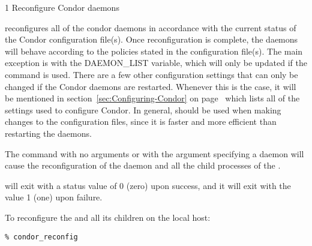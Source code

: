\begin{ManPage}{\label{man-condor-reconfig}}{1}
{Reconfigure Condor daemons}
\Synopsis {}
\ToolArgsBase

\ToolArgsLocate
\ToolArgsAffect

\ToolWhere
\ToolArgsAffect


\Description 

 reconfigures all of the condor daemons in accordance with 
the current
status of the Condor configuration file(s).  
Once reconfiguration is complete, the daemons will behave according to
the policies stated in the configuration file(s).
The main exception is with the DAEMON\_LIST variable, which will only be
updated if the  command is used.  
There are a few other configuration settings that can only be changed
if the Condor daemons are restarted.
Whenever this is the case, it will be mentioned in
section~\ref{sec:Configuring-Condor} on
page~\pageref{sec:Configuring-Condor} which lists all of the settings
used to configure Condor. 
In general,  should be used when making changes to
the configuration files, since it is faster and more efficient than
restarting the daemons.

The command 
with no arguments or with the  argument specifying
a daemon will cause the reconfiguration of the 
daemon and all the child processes of the .

\begin{Options}
    \ToolArgsBaseDesc
    \ToolArgsLocateDesc
\end{Options}

\ExitStatus

 will exit with a status value of 0 (zero) upon success,
and it will exit with the value 1 (one) upon failure.

\Examples
To reconfigure the  and all its children
on the local host:
\begin{verbatim}
% condor_reconfig
\end{verbatim}


\end{ManPage}

